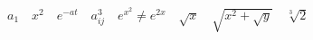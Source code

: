 \documentclass{article}
\begin{document}
\begin{CJK*}{GBK}{song}

\begin{math}
a_{1}\quad x^{2} \quad e^{-at} \quad  a^{3}_{ij} \quad  e^{x^{2}} \neq e^{2x} \quad \sqrt{x} \quad \sqrt{x^{2} + \sqrt{y}}  \quad \sqrt[3]{2}
\end{math}


\end{CJK*}
\end{document}
